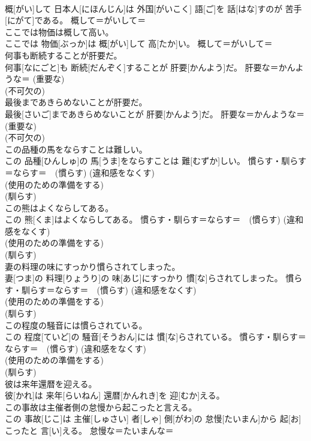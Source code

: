 \documentclass[8pt]{extreport}
\begin{document}
\begin{CJK}{UTF8}{min}
{\\	概[がい]して 日本人[にほんじん]は 外国[がいこく] 語[ご]を 話[はな]すのが 苦手[にがて]である。	概して＝がいして＝ 
\\	ここでは物価は概して高い。	
\\	ここでは 物価[ぶっか]は 概[がい]して 高[たか]い。	概して＝がいして＝ 
\\	何事も断続することが肝要だ。	
\\	何事[なにごと]も 断続[だんぞく]することが 肝要[かんよう]だ。	肝要な＝かんような＝ (重要な) 
\\	(不可欠の) 
\\	最後まであきらめないことが肝要だ。	
\\	最後[さいご]まであきらめないことが 肝要[かんよう]だ。	肝要な＝かんような＝ (重要な) 
\\	(不可欠の) 
\\	この品種の馬をならすことは難しい。	
\\	この 品種[ひんしゅ]の 馬[うま]をならすことは 難[むずか]しい。	慣らす・馴らす＝ならす＝　(慣らす) (違和感をなくす) 
\\	(使用のための準備をする) 
\\	(馴らす) 
\\	この熊はよくならしてある。	
\\	この 熊[くま]はよくならしてある。	慣らす・馴らす＝ならす＝　(慣らす) (違和感をなくす) 
\\	(使用のための準備をする) 
\\	(馴らす) 
\\	妻の料理の味にすっかり慣らされてしまった。	
\\	妻[つま]の 料理[りょうり]の 味[あじ]にすっかり 慣[な]らされてしまった。	慣らす・馴らす＝ならす＝　(慣らす) (違和感をなくす) 
\\	(使用のための準備をする) 
\\	(馴らす) 
\\	この程度の騒音には慣らされている。	
\\	この 程度[ていど]の 騒音[そうおん]には 慣[な]らされている。	慣らす・馴らす＝ならす＝　(慣らす) (違和感をなくす) 
\\	(使用のための準備をする) 
\\	(馴らす) 
\\	彼は来年還暦を迎える。	
\\	彼[かれ]は 来年[らいねん] 還暦[かんれき]を 迎[むか]える。	
\\	この事故は主催者側の怠慢から起こったと言える。	
\\	この 事故[じこ]は 主催[しゅさい] 者[しゃ] 側[がわ]の 怠慢[たいまん]から 起[お]こったと 言[い]える。	怠慢な＝たいまんな＝ 
}
\end{CJK}
\end{document}
